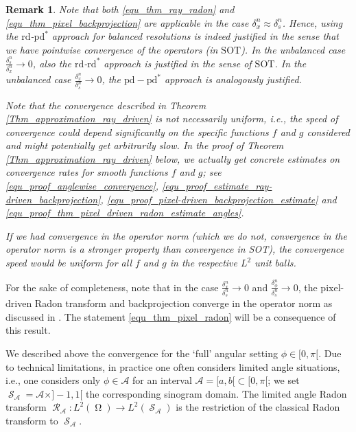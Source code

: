 \documentclass[11pt,reqno]{amsart}
\DeclareMathOperator{\Radon}{\mathcal{R}}
\DeclareMathOperator{\imgdom}{\Omega}
\DeclareMathOperator{\sinodom}{\mathcal{S}}
\numberwithin{theorem}{section}
\newtheorem{remark}[theorem]{Remark}
\theoremstyle{remark}
\begin{document}
\begin{remark}
Note that both \eqref{equ_thm_ray_radon} and \eqref{equ_thm_pixel_backprojection} are applicable in the case $\delta_x^n\approx \delta_s^n$. Hence, using the $\mathrm{rd}$-$\mathrm{pd}^*$ approach for balanced resolutions is indeed justified in the sense that we have pointwise convergence of the operators (in $\mathrm{SOT}$).
In the unbalanced case $\frac{\delta_s^n}{\delta_x^n}\to 0$, also the $\mathrm{rd}$-$\mathrm{rd}^*$ approach is justified in the sense of $\mathrm{SOT}$. In the unbalanced case $\frac{\delta_x^n}{\delta_s^n}\to 0$, the $\mathrm{pd}-\mathrm{pd}^*$ approach is analogously justified.

Note that the convergence described in Theorem \ref{Thm_approximation_ray_driven} is not necessarily uniform, i.e., the speed of convergence could depend significantly on the specific functions $f$ and $g$ considered and might potentially get arbitrarily slow. In the proof of Theorem \ref{Thm_approximation_ray_driven} below, we actually get concrete estimates on convergence rates for smooth functions $f$ and $g$; see \eqref{equ_proof_anglewise_convergence}, \eqref{equ_proof_estimate_ray-driven_backprojection}, \eqref{equ_proof_pixel-driven_backprojection_estimate} and \eqref{equ_proof_thm_pixel_driven_radon_estimate_angles}.


If we had convergence in the operator norm (which we do not, convergence in the operator norm is a stronger property than convergence in SOT), the convergence speed would be uniform for all $f$ and $g$ in the respective $L^2$ unit balls.
\end{remark}

For the sake of completeness, note that in the case $\frac{\delta_x^n}{\delta_s^n}\to 0$ and $\frac{\delta_\phi^n}{\delta_s^n}\to 0$, the pixel-driven Radon transform and backprojection converge in the operator norm as discussed in \cite{doi:10.1137/20M1326635}. The statement \eqref{equ_thm_pixel_radon} will be a consequence of this result.





We described above the convergence for the `full' angular setting $\phi \in [0,\pi[$. Due to technical limitations, in practice one often considers limited angle situations, i.e., one considers only $\phi \in \mathcal{A}$ for an interval $\mathcal{A}=[a,b[\subset [0,\pi[$; we set $\sinodom_{\mathcal{A}} = \mathcal{A}\times ]-1,1[$ the corresponding sinogram domain. The limited angle Radon transform  $\Radon_\mathcal{A}\colon L^2(\imgdom) \to L^2(\sinodom_\mathcal{A})$ is the restriction of the classical Radon transform to $\sinodom_\mathcal{A}$. 
\end{document}
